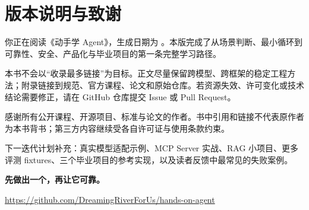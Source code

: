 \chapter*{版本说明与致谢}

你正在阅读《动手学 Agent》\BookVersion，生成日期为 \BookDate。本版完成了从场景判断、最小循环到可靠性、安全、产品化与毕业项目的第一条完整学习路径。

本书不会以“收录最多链接”为目标。正文尽量保留跨模型、跨框架的稳定工程方法；附录链接到规范、官方课程、论文和原始仓库。若资源失效、许可变化或技术结论需要修正，请在 GitHub 仓库提交 Issue 或 Pull Request。

感谢所有公开课程、开源项目、标准与论文的作者。书中引用和链接不代表原作者为本书背书；第三方内容继续受各自许可证与使用条款约束。

\begin{takeaway}[下一版重点]
下一迭代计划补充：真实模型适配示例、MCP Server 实战、RAG 小项目、更多评测 fixtures、三个毕业项目的参考实现，以及读者反馈中最常见的失败案例。
\end{takeaway}

\begin{center}
\vfill
{\sffamily\bfseries\Large 先做出一个，再让它可靠。}\par
\vspace{1em}
\url{https://github.com/DreamingRiverForUs/hands-on-agent}
\end{center}

